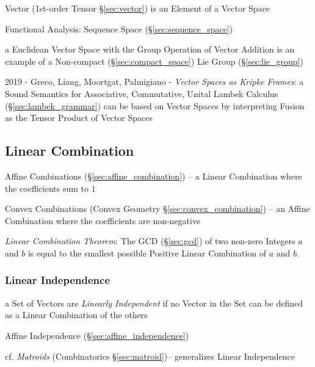 Vector (1st-order Tensor \S\ref{sec:vector}) is an Element of a Vector
Space

Functional Analysis: Sequence Space (\S\ref{sec:sequence_space})

a Euclidean Vector Space with the Group Operation of Vector Addition is an
example of a Non-compact (\S\ref{sec:compact_space}) Lie Group
(\S\ref{sec:lie_group})

2019 - Greco, Liang, Moortgat, Palmigiano - \emph{Vector Spaces as Kripke
  Frames}: a Sound Semantics for Associative, Commutative, Unital Lambek
Calculus (\S\ref{sec:lambek_grammar}) can be based on Vector Spaces by
interpreting Fusion as the Tensor Product of Vector Spaces



\subsection{Linear Combination}\label{sec:linear_combination}

\fist Affine Combinations (\S\ref{sec:affine_combination}) -- a Linear
Combination where the coefficients sum to $1$

\fist Convex Combinations (Convex Geometry \S\ref{sec:convex_combination}) -- an
Affine Combination where the coefficients are non-negative

\emph{Linear Combination Theorem}: The GCD (\S\ref{sec:gcd}) of two non-zero
Integers $a$ and $b$ is equal to the smallest possible Positive Linear
Combination of $a$ and $b$.



\subsubsection{Linear Independence}\label{sec:linear_independence}

a Set of Vectors are \emph{Linearly Independent} if no Vector in the Set can be
defined as a Linear Combination of the others

\fist Affine Independence (\S\ref{sec:affine_independence})

\fist cf. \emph{Matroids} (Combinatorics \S\ref{sec:matroid})-- generalizes
Linear Independence



